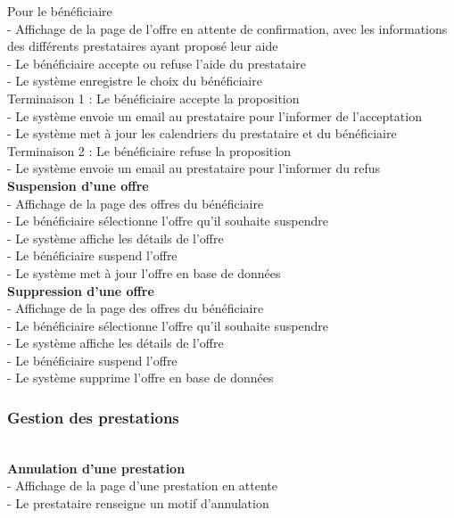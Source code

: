 \documentclass[conference]{IEEEtran}
\begin{document}
Pour le bénéficiaire\\
- Affichage de la page de l'offre en attente de confirmation, avec les informations des différents prestataires ayant proposé leur aide\\
- Le bénéficiaire accepte ou refuse l'aide du prestataire\\
- Le système enregistre le choix du bénéficiaire\\

Terminaison 1 : Le bénéficiaire accepte la proposition\\
- Le système envoie un email au prestataire pour l'informer de l'acceptation\\
- Le système met à jour les calendriers du prestataire et du bénéficiaire\\

Terminaison 2 : Le bénéficiaire refuse la proposition\\
- Le système envoie un email au prestataire pour l'informer du refus\\

\textbf{Suspension d'une offre}\hfil\\
- Affichage de la page des offres du bénéficiaire\\
- Le bénéficiaire sélectionne l'offre qu'il souhaite suspendre\\
- Le système affiche les détails de l'offre\\
- Le bénéficiaire suspend l'offre\\
- Le système met à jour l'offre en base de données\\

\textbf{Suppression d'une offre}\hfil\\
- Affichage de la page des offres du bénéficiaire\\
- Le bénéficiaire sélectionne l'offre qu'il souhaite suspendre\\
- Le système affiche les détails de l'offre\\
- Le bénéficiaire suspend l'offre\\
- Le système supprime l'offre en base de données\\


\subsubsection{Gestion des prestations}\hfil\\

\textbf{Annulation d'une prestation}\hfil\\
- Affichage de la page d'une prestation en attente\\
- Le prestataire renseigne un motif d'annulation\\
\end{document}
